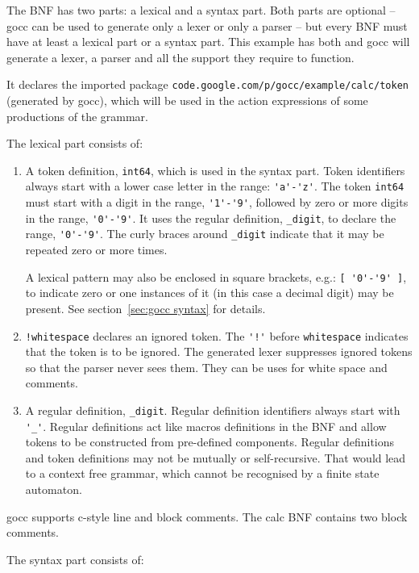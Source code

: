 \documentclass[12pt]{article}
\begin{document}
		The BNF has two parts: a lexical and a syntax part. Both parts are optional -- gocc can be used to generate only a lexer or only a parser -- but every BNF must have at least a lexical part or a syntax part. This example has both and gocc will generate a lexer, a parser and all the support they require to function.

		It declares the imported package \verb|code.google.com/p/gocc/example/calc/token| (generated by gocc), which will be used in the action expressions of some productions of the grammar.

		The lexical part consists of:

		\begin{enumerate}
			\item A token definition, \verb|int64|, which is used in the syntax part. Token identifiers always start with a lower case letter in the range: \verb|'a'-'z'|. The token \verb|int64| must start with a digit in the range, \verb|'1'-'9'|, followed by zero or more digits in the range, \verb|'0'-'9'|. It uses the regular definition, \verb|_digit|, to declare the range, \verb|'0'-'9'|. The curly braces around \verb|_digit| indicate that it may be repeated zero or more times.

			A lexical pattern may also be enclosed in square brackets, e.g.: \verb|[ '0'-'9' ]|, to indicate zero or one instances of it (in this case a decimal digit) may be present. See section~\ref{sec:gocc syntax} for details.

			\item \verb|!whitespace| declares an ignored token. The \verb|'!'| before \verb|whitespace| indicates that the token is to be ignored. The generated lexer suppresses ignored tokens so that the parser never sees them. They can be uses for white space and comments.

			\item A regular definition, \verb|_digit|. Regular definition identifiers always start with \verb|'_'|. Regular definitions act like macros definitions in the BNF and allow tokens to be constructed from pre-defined components. Regular definitions and token definitions may not be mutually or self-recursive. That would lead to a context free grammar, which cannot be recognised by a finite state automaton.
		\end{enumerate}

		gocc supports c-style line and block comments. The calc BNF contains two block comments.

		The syntax part consists of:
\end{document}
